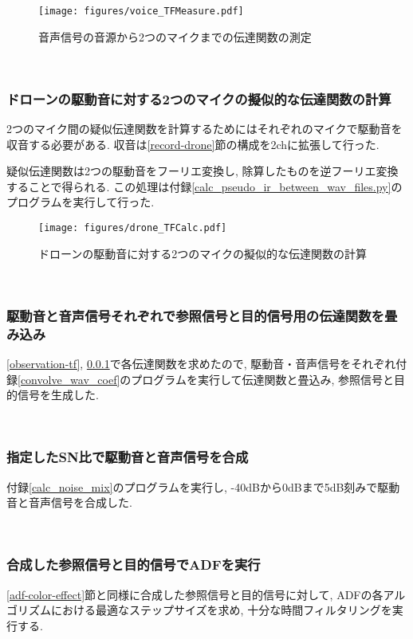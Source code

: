 \begin{figure}[H]
\centering
\texttt{[image: figures/voice\_TFMeasure.pdf]}
\caption{音声信号の音源から2つのマイクまでの伝達関数の測定}
\end{figure}

\
\subsubsection{ドローンの駆動音に対する2つのマイクの擬似的な伝達関数の計算}\label{pseudo-tf}

2つのマイク間の疑似伝達関数を計算するためにはそれぞれのマイクで駆動音を収音する必要がある. 収音は\ref{record-drone}節の構成を2chに拡張して行った. 

疑似伝達関数は2つの駆動音をフーリエ変換し, 除算したものを逆フーリエ変換することで得られる. この処理は付録\ref{calc_pseudo_ir_between_wav_files.py}のプログラムを実行して行った. 

\begin{figure}[H]
\centering
\texttt{[image: figures/drone\_TFCalc.pdf]}
\caption{ドローンの駆動音に対する2つのマイクの擬似的な伝達関数の計算}
\end{figure}

\
\subsubsection{駆動音と音声信号それぞれで参照信号と目的信号用の伝達関数を畳み込み}\label{convolve-each}

\ref{observation-tf}, \ref{pseudo-tf}で各伝達関数を求めたので, 駆動音・音声信号をそれぞれ付録\ref{convolve_wav_coef}のプログラムを実行して伝達関数と畳込み, 参照信号と目的信号を生成した. 

\
\subsubsection{指定したSN比で駆動音と音声信号を合成}\label{mix-snr}

付録\ref{calc_noise_mix}のプログラムを実行し, -40dBから0dBまで5dB刻みで駆動音と音声信号を合成した. 

\
\subsubsection{合成した参照信号と目的信号でADFを実行}\label{exec-adf}

\ref{adf-color-effect}節と同様に合成した参照信号と目的信号に対して, ADFの各アルゴリズムにおける最適なステップサイズを求め, 十分な時間フィルタリングを実行する. 

